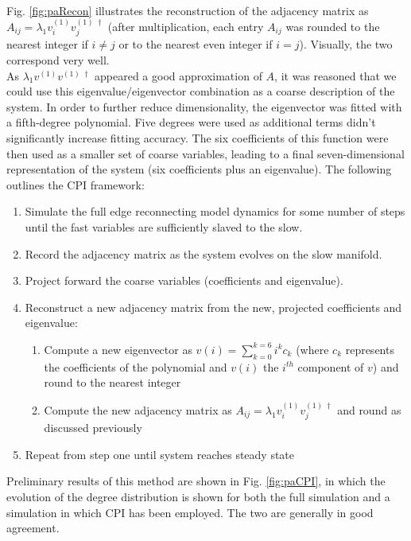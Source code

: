 \documentclass[11pt]{article}
\begin{document}
\\
Fig. \ref{fig:paRecon} illustrates the reconstruction of the adjacency matrix as $A_{ij}=\lambda_{1}v^{(1)}_{i}v^{(1) \;\dagger}_{j}$ (after multiplication, each entry $A_{ij}$ was rounded to the nearest integer if $i\neq j$ or to the nearest even integer if $i=j$). Visually, the two correspond very well. \\
\indent As $\lambda_{1}v^{(1)}v^{(1) \;\dagger}$ appeared a good approximation of $A$, it was reasoned that we could use this eigenvalue/eigenvector combination as a coarse description of the system. In order to further reduce dimensionality, the eigenvector was fitted with a fifth-degree polynomial. Five degrees were used as additional terms didn't significantly increase fitting accuracy. The six coefficients of this function were then used as a smaller set of coarse variables, leading to a final seven-dimensional representation of the system (six coefficients plus an eigenvalue). The following outlines the CPI framework:
\begin{enumerate}
\item Simulate the full edge reconnecting model dynamics for some number of steps until the fast variables are sufficiently slaved to the slow.
\item Record the adjacency matrix as the system evolves on the slow manifold.
\item Project forward the coarse variables (coefficients and eigenvalue).
\item Reconstruct a new adjacency matrix from the new, projected coefficients and eigenvalue:
  \begin{enumerate}
  \item Compute a new eigenvector as $v(i) = \displaystyle\sum\limits_{k=0}^{k=6} i^{k}c_{k}$ (where $c_{k}$ represents the coefficients of the polynomial and $v(i)$ the $i^{th}$ component of $v$) and round to the nearest integer
  \item Compute the new adjacency matrix as $A_{ij}=\lambda_{1}v^{(1)}_{i}v^{(1) \;\dagger}_{j}$ and round as discussed previously
  \end{enumerate}
\item Repeat from step one until system reaches steady state
\end{enumerate}
Preliminary results of this method are shown in Fig. \ref{fig:paCPI}, in which the evolution of the degree distribution is shown for both the full simulation and a simulation in which CPI has been employed. The two are generally in good agreement.
\end{document}
